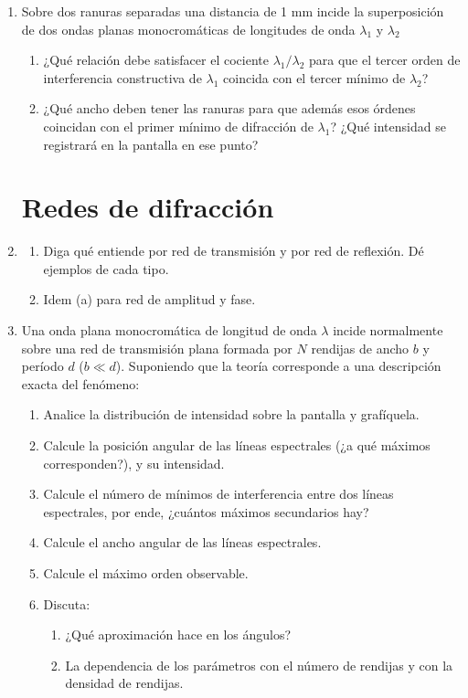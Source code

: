 \documentclass[11pt,spanish,a4paper]{article}
\begin{document}
\begin{enumerate}
\item Sobre dos ranuras separadas una distancia de 1 mm incide la superposición
de dos ondas planas monocromáticas de longitudes de onda $\lambda_{1}$
y $\lambda_{2}$
\begin{enumerate}
\item ¿Qué relación debe satisfacer el cociente $\lambda_{1}/\lambda_{2}$
para que el tercer orden de interferencia constructiva de $\lambda_{1}$
coincida con el tercer mínimo de $\lambda_{2}$? 
\item ¿Qué ancho deben tener las ranuras para que además esos órdenes coincidan
con el primer mínimo de difracción de $\lambda_{1}$? ¿Qué intensidad
se registrará en la pantalla en ese punto? 
\end{enumerate}


\section*{Redes de difracción}
\item 
\begin{enumerate}
\item Diga qué entiende por red de transmisión y por red de reflexión. Dé
ejemplos de cada tipo.
\item Idem (a) para red de amplitud y fase. 
\end{enumerate}


\item Una onda plana monocromática de longitud de onda $\lambda$ incide
normalmente sobre una red de transmisión plana formada por $N$ rendijas
de ancho $b$ y período $d$ ($b\ll d$). Suponiendo que la teoría
corresponde a una descripción exacta del fenómeno: 
\begin{enumerate}
\item Analice la distribución de intensidad sobre la pantalla y grafíquela.
\item Calcule la posición angular de las líneas espectrales (¿a qué máximos
corresponden?), y su intensidad.
\item Calcule el número de mínimos de interferencia entre dos líneas espectrales,
por ende, ¿cuántos máximos secundarios hay?
\item Calcule el ancho angular de las líneas espectrales.
\item Calcule el máximo orden observable. 
\item Discuta: 
\begin{enumerate}
\item ¿Qué aproximación hace en los ángulos?
\item La dependencia de los parámetros con el número de rendijas y con la
densidad de rendijas. 
\end{enumerate}
\end{enumerate}



\end{enumerate}
\end{document}
